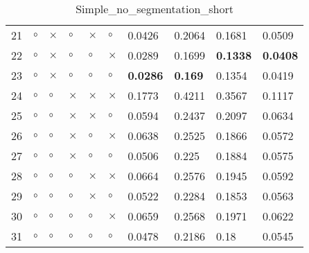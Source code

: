 \begin{table}[H]
\begin{tabular}{|P{0.7cm}|P{1.3cm}P{1.3cm}P{1.3cm}P{1.3cm}P{1.3cm}|P{1.1cm}P{1.1cm}P{1.1cm}P{1.1cm}|}
  21 &  $\circ$ & $\times$ &  $\circ$ & $\times$ &     $\circ$ &          0.0426 &         0.2064 &          0.1681 &          0.0509 \\
  22 &  $\circ$ & $\times$ &  $\circ$ &  $\circ$ &    $\times$ &          0.0289 &         0.1699 & \textbf{0.1338} & \textbf{0.0408} \\
  23 &  $\circ$ & $\times$ &  $\circ$ &  $\circ$ &     $\circ$ & \textbf{0.0286} & \textbf{0.169} &          0.1354 &          0.0419 \\
  24 &  $\circ$ &  $\circ$ & $\times$ & $\times$ &    $\times$ &          0.1773 &         0.4211 &          0.3567 &          0.1117 \\
  25 &  $\circ$ &  $\circ$ & $\times$ & $\times$ &     $\circ$ &          0.0594 &         0.2437 &          0.2097 &          0.0634 \\
  26 &  $\circ$ &  $\circ$ & $\times$ &  $\circ$ &    $\times$ &          0.0638 &         0.2525 &          0.1866 &          0.0572 \\
  27 &  $\circ$ &  $\circ$ & $\times$ &  $\circ$ &     $\circ$ &          0.0506 &          0.225 &          0.1884 &          0.0575 \\
  28 &  $\circ$ &  $\circ$ &  $\circ$ & $\times$ &    $\times$ &          0.0664 &         0.2576 &          0.1945 &          0.0592 \\
  29 &  $\circ$ &  $\circ$ &  $\circ$ & $\times$ &     $\circ$ &          0.0522 &         0.2284 &          0.1853 &          0.0563 \\
  30 &  $\circ$ &  $\circ$ &  $\circ$ &  $\circ$ &    $\times$ &          0.0659 &         0.2568 &          0.1971 &          0.0622 \\
  31 &  $\circ$ &  $\circ$ &  $\circ$ &  $\circ$ &     $\circ$ &          0.0478 &         0.2186 &            0.18 &          0.0545 \\
\hline
\end{tabular}
\caption{Simple_no_segmentation_short}
\label{tab:}
\end{table}
